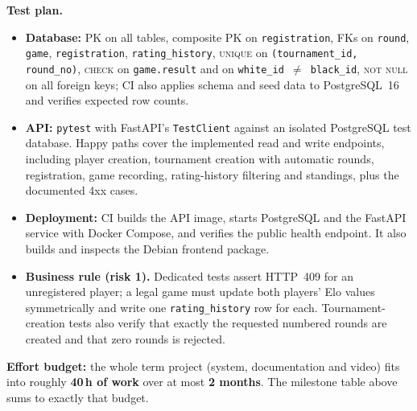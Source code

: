\documentclass[11pt,a4paper]{article}
\begin{document}
\textbf{Test plan.}
\begin{itemize}[topsep=2pt]
  \item \textbf{Database:} PK on all tables, composite PK on
        \texttt{registration}, FKs on \texttt{round}, \texttt{game},
        \texttt{registration}, \texttt{rating\_history}, \textsc{unique} on
        \texttt{(tournament\_id, round\_no)}, \textsc{check} on
        \texttt{game.result} and on \texttt{white\_id $\neq$ black\_id},
        \textsc{not null} on all foreign keys; CI also applies schema and seed
        data to PostgreSQL~16 and verifies expected row counts.
  \item \textbf{API:} \texttt{pytest} with FastAPI's \texttt{TestClient}
        against an isolated PostgreSQL test database. Happy paths cover the
        implemented read and write endpoints, including player creation,
        tournament creation with automatic rounds, registration, game recording,
        rating-history filtering and standings, plus the documented 4xx cases.
  \item \textbf{Deployment:} CI builds the API image, starts PostgreSQL and the
        FastAPI service with Docker Compose, and verifies the public health
        endpoint. It also builds and inspects the Debian frontend package.
  \item \textbf{Business rule (risk 1).} Dedicated tests assert HTTP~409 for an
        unregistered player; a legal game must update both players' Elo values
        symmetrically and write one \texttt{rating\_history} row for each.
        Tournament-creation tests also verify that exactly the requested numbered
        rounds are created and that zero rounds is rejected.
\end{itemize}

\vspace{1em}
\begin{infobox}
\textbf{Effort budget:} the whole term project (system, documentation and video)
fits into roughly \textbf{40\,h of work} over at most \textbf{2 months}. The
milestone table above sums to exactly that budget.
\end{infobox}
\end{document}

